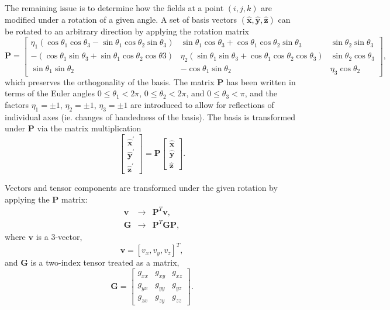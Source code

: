 \documentclass{article}
\begin{document}
The remaining issue is to determine how the fields at a point
$(i,j,k)$ are modified under a rotation of a given angle. A set of
basis vectors $(\mathbf{\hat{x}},\mathbf{\hat{y}},\mathbf{\hat{z}})$
can be rotated to an arbitrary direction by applying the rotation
matrix
\begin{equation}
  \mathbf{P} = 
  \left[
    \begin{array}{ccc}
      \eta_1(\cos\theta_1\cos\theta_3 - \sin\theta_1\cos\theta_2\sin\theta_3) &
      \sin\theta_1\cos\theta_3 + \cos\theta_1\cos\theta_2\sin\theta_3 &
      \sin\theta_2\sin\theta_3 \\
      -(\cos\theta_1\sin\theta_3 + \sin\theta_1\cos\theta_2\cos\theta3) &
      \eta_2(\sin\theta_1\sin\theta_3 + \cos\theta_1\cos\theta_2\cos\theta_3) &
      \sin\theta_2\cos\theta_3 \\
      \sin\theta_1\sin\theta_2 &
      -\cos\theta_1\sin\theta_2 &
      \eta_3\cos\theta_2
    \end{array}
  \right],
\end{equation}
which preserves the orthogonality of the basis. The matrix
$\mathbf{P}$ has been written in terms of the Euler angles
$0\leq\theta_1<2\pi$, $0\leq\theta_2<2\pi$, and $0\leq\theta_3<\pi$,
and the factors $\eta_1=\pm 1$, $\eta_2=\pm 1$, $\eta_3=\pm 1$ are
introduced to allow for reflections of individual axes (ie. changes of
handedness of the basis).
The basis is transformed under $\mathbf{P}$ via the matrix multiplication
\begin{equation}
  \left[
    \begin{array}{c}
      \mathbf{\hat{x}^\prime} \\
      \mathbf{\hat{y}^\prime} \\
      \mathbf{\hat{z}^\prime}
    \end{array}
  \right]
  =
  \mathbf{P} 
  \left[
    \begin{array}{c}
      \mathbf{\hat{x}} \\
      \mathbf{\hat{y}} \\
      \mathbf{\hat{z}} 
    \end{array}
  \right].
\end{equation}

Vectors and tensor components are transformed under the given rotation
by applying the $\mathbf{P}$ matrix:
\begin{eqnarray}
  \mathbf{v} & \rightarrow & \mathbf{P}^T \mathbf{v}, \\
  \mathbf{G} & \rightarrow & \mathbf{P}^T \mathbf{G} \mathbf{P},
\end{eqnarray}
where $\mathbf{v}$ is a 3-vector,
\begin{equation}
  \mathbf{v} = [v_x, v_y, v_z]^T,
\end{equation}
and $\mathbf{G}$ is a two-index tensor treated as a matrix,
\begin{equation}
  \mathbf{G} =
    \left[
      \begin{array}{ccc}
	g_{xx} & g_{xy} & g_{xz} \\
	g_{yx} & g_{yy} & g_{yz} \\
	g_{zx} & g_{zy} & g_{zz}
      \end{array}
    \right].
\end{equation}
\end{document}
